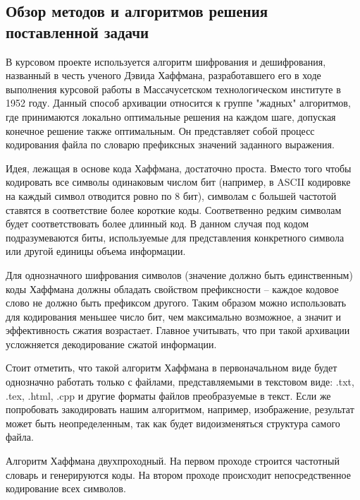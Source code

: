 \subsection{Обзор методов и алгоритмов решения поставленной задачи}

В курсовом проекте используется алгоритм шифрования и дешифрования, названный в честь ученого Дэвида Хаффмана, разработавшего его в ходе выполнения курсовой работы в Массачусетском технологическом институте в 1952 году.
Данный способ архивации относится к группе "жадных" алгоритмов, где принимаются локально оптимальные решения на каждом шаге, допуская конечное решение также оптимальным.
Он представляет собой процесс кодирования файла по словарю префиксных значений заданного выражения.



Идея, лежащая в основе кода Хаффмана, достаточно проста. 
Вместо того чтобы кодировать все символы одинаковым числом бит (например, в ASCII кодировке на каждый символ отводится ровно по 8 бит), символам с большей частотой ставятся в соответствие более короткие коды.
Соответвенно редким символам будет соответствовать более длинный код.
В данном случая под кодом подразумеваются биты, используемые для представления конкретного символа или другой единицы объема информации.



Для однозначного шифрования символов (значение должно быть единственным) коды Хаффмана должны обладать свойством префиксности -- каждое кодовое слово не должно быть префиксом другого.
Таким образом можно использовать для кодирования меньшее число бит, чем максимально возможное, а значит и эффективность сжатия возрастает.
Главное учитывать, что при такой архивации усложняется декодирование сжатой информации.



Стоит отметить, что такой алгоритм Хаффмана в первоначальном виде будет однозначно работать только с файлами, представляемыми в текстовом виде: .txt, .tex, .html, .cpp и другие форматы файлов преобразуемые в текст.
Если же попробовать закодировать нашим алгоритмом, например, изображение, результат может быть неопределенным, так как будет видоизменяться структура самого файла.



Алгоритм Хаффмана двухпроходный. На первом проходе строится частотный словарь и генерируются коды. 
На втором проходе происходит непосредственное кодирование всех символов.



